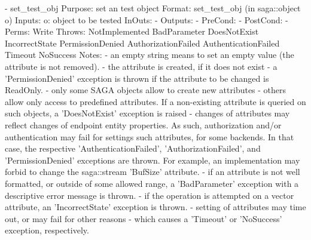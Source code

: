  \begin{myspec}
    - set_test_obj
      Purpose:  set an test object
      Format:   set_test_obj         (in saga::object o)
      Inputs:   o:                    object to be tested
      InOuts:   -
      Outputs:  -
      PreCond:  -
      PostCond: -
      Perms:    Write
      Throws:   NotImplemented
                BadParameter
                DoesNotExist
                IncorrectState
                PermissionDenied
                AuthorizationFailed
                AuthenticationFailed
                Timeout
                NoSuccess
      Notes:    - an empty string means to set an empty value
                  (the attribute is not removed).
                - the attribute is created, if it does not exist
                - a 'PermissionDenied' exception is thrown if the
                  attribute to be changed is ReadOnly.
                - only some SAGA objects allow to create new
                  attributes - others allow only access to
                  predefined attributes.  If a non-existing
                  attribute is queried on such objects, a
                  'DoesNotExist' exception is raised
                - changes of attributes may reflect changes of
                  endpoint entity properties.  As such,
                  authorization and/or authentication may fail
                  for settings such attributes, for some
                  backends.  In that case, the respective
                  'AuthenticationFailed', 'AuthorizationFailed',
                  and 'PermissionDenied' exceptions are thrown.
                  For example, an implementation may forbid to
                  change the saga::stream 'BufSize' attribute.
                - if an attribute is not well formatted, or
                  outside of some allowed range, a 'BadParameter'
                  exception with a descriptive error message is
                  thrown.
                - if the operation is attempted on a vector
                  attribute, an 'IncorrectState' exception is
                  thrown.
                - setting of attributes may time out, or may fail
                  for other reasons - which causes a 'Timeout' or
                  'NoSuccess' exception, respectively.
 

\end{myspec}
